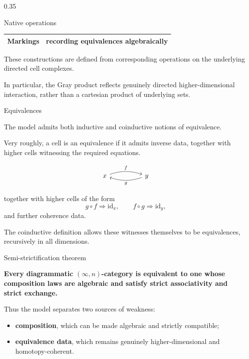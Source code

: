\documentclass[final]{beamer}
\begin{document}
\begin{frame}[fragile, t]
\begin{columns}[t,totalwidth=\textwidth]
\begin{column}{0.35\textwidth}
\begin{block}{Native operations}
\begin{center}
\begin{tabular}{@{}ll@{}}
Markings
  & recording equivalences algebraically \\
\bottomrule
\end{tabular}
\end{center}

\medskip

These constructions are defined from corresponding operations on the
underlying directed cell complexes.

\medskip

In particular, the Gray product reflects genuinely directed
higher-dimensional interaction, rather than a cartesian product of
underlying sets.

\end{block}

\begin{block}{Equivalences}

The model admits both inductive and coinductive notions of equivalence.

\medskip

Very roughly, a cell is an equivalence if it admits inverse data,
together with higher cells witnessing the required equations.

\[
\begin{tikzcd}[column sep=huge,row sep=large]
x
  \arrow[r,bend left=18,"f"]
&
y
  \arrow[l,bend left=18,"g"]
\end{tikzcd}
\]

together with higher cells of the form
\[
  g\circ f \Rightarrow \mathrm{id}_x,
  \qquad
  f\circ g \Rightarrow \mathrm{id}_y,
\]
and further coherence data.

\medskip

The coinductive definition allows these witnesses themselves to be
equivalences, recursively in all dimensions.

\end{block}

\begin{alertblock}{Semi-strictification theorem}

\begin{center}
\Large
\textbf{
Every diagrammatic $(\infty,n)$-category is equivalent to one whose
composition laws are algebraic and satisfy strict associativity and
strict exchange.
}
\end{center}

\medskip

Thus the model separates two sources of weakness:

\begin{itemize}
  \item \textbf{composition}, which can be made algebraic and strictly compatible;
  \item \textbf{equivalence data}, which remains genuinely higher-dimensional
        and homotopy-coherent.
\end{itemize}


\end{alertblock}
\end{column}
\end{columns}
\end{frame}
\end{document}
